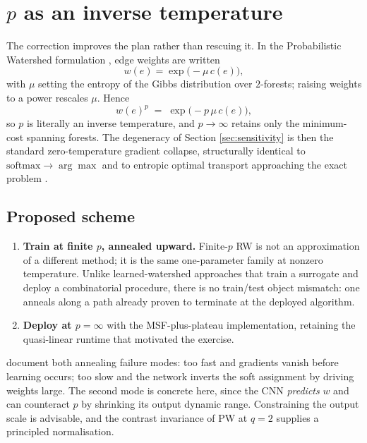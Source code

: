 \documentclass[11pt,a4paper]{article}
\theoremstyle{definition}
\begin{document}
\section{$p$ as an inverse temperature}
\label{sec:temperature}

The correction improves the plan rather than rescuing it. In the
Probabilistic Watershed formulation \citep{fitasanmartin2019probabilistic},
edge weights are written
\begin{equation}
  w(e) = \exp\!\big(-\mu\, c(e)\big),
\end{equation}
with $\mu$ setting the entropy of the Gibbs distribution over $2$-forests;
raising weights to a power rescales $\mu$. Hence
\begin{equation}
  w(e)^{p} \;=\; \exp\!\big(-p\,\mu\, c(e)\big),
\end{equation}
so $p$ is literally an inverse temperature, and $p\to\infty$ retains only
the minimum-cost spanning forests. The degeneracy of Section
\ref{sec:sensitivity} is then the standard zero-temperature gradient
collapse, structurally identical to
$\mathrm{softmax}\to\arg\max$ \citep{jang2017categorical} and to
entropic optimal transport approaching the exact problem
\citep{cuturi2013sinkhorn}.

\subsection{Proposed scheme}

\begin{enumerate}
  \item \textbf{Train at finite $p$, annealed upward.} Finite-$p$ RW is
    not an approximation of a different method; it is the same
    one-parameter family at nonzero temperature. Unlike learned-watershed
    approaches \citep{wolf2017learned} that train a surrogate and deploy a
    combinatorial procedure, there is no train/test object mismatch: one
    anneals along a path already proven to terminate at the deployed
    algorithm.
  \item \textbf{Deploy at $p=\infty$} with the MSF-plus-plateau
    implementation, retaining the quasi-linear runtime that motivated the
    exercise.
\end{enumerate}

\noindent
\citet{agustsson2017soft} document both annealing failure modes: too fast
and gradients vanish before learning occurs; too slow and the network
inverts the soft assignment by driving weights large. The second mode is
concrete here, since the CNN \emph{predicts} $w$ and can counteract $p$ by
shrinking its output dynamic range. Constraining the output scale is
advisable, and the contrast invariance of PW at $q=2$ supplies a
principled normalisation.
\end{document}
